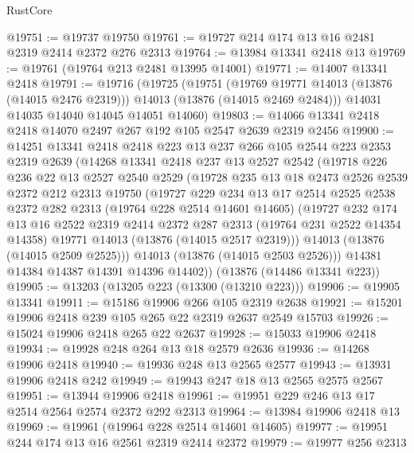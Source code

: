 \begin{lexlean}{RustCore}
\begin{coremodule}
@19751 := @19737 @19750
@19761 := @19727 @214 @174 @13 @16 @2481 @2319 @2414 @2372 @276 @2313
@19764 := @13984 @13341 @2418 @13
@19769 := @19761 (@19764 @213 @2481 @13995 @14001)
@19771 := @14007 @13341 @2418
@19791 := @19716
    (@19725
      (@19751
        (@19769 @19771 @14013 (@13876 (@14015 @2476 @2319)))
        @14013
        (@13876 (@14015 @2469 @2484)))
      @14031
      @14035
      @14040
      @14045
      @14051
      @14060)
@19803 := @14066 @13341 @2418 @2418 @14070 @2497 @267 @192 @105 @2547 @2639 @2319 @2456
@19900 := @14251
    @13341
    @2418
    @2418
    @223
    @13
    @237
    @266
    @105
    @2544
    @223
    @2353
    @2319
    @2639
    (@14268
      @13341
      @2418
      @237
      @13
      @2527
      @2542
      (@19718
        @226
        @236
        @22
        @13
        @2527
        @2540
        @2529
        (@19728
          @235
          @13
          @18
          @2473
          @2526
          @2539
          @2372
          @212
          @2313
          @19750
          (@19727
            @229
            @234
            @13
            @17
            @2514
            @2525
            @2538
            @2372
            @282
            @2313
            (@19764 @228 @2514 @14601 @14605)
            (@19727
              @232
              @174
              @13
              @16
              @2522
              @2319
              @2414
              @2372
              @287
              @2313
              (@19764 @231 @2522 @14354 @14358)
              @19771
              @14013
              (@13876 (@14015 @2517 @2319)))
            @14013
            (@13876 (@14015 @2509 @2525)))
          @14013
          (@13876 (@14015 @2503 @2526)))
        @14381
        @14384
        @14387
        @14391
        @14396
        @14402))
    (@13876 (@14486 @13341 @223))
@19905 := @13203 (@13205 @223 (@13300 (@13210 @223)))
@19906 := @19905 @13341
@19911 := @15186 @19906 @266 @105 @2319 @2638
@19921 := @15201 @19906 @2418 @239 @105 @265 @22 @2319 @2637 @2549 @15703
@19926 := @15024 @19906 @2418 @265 @22 @2637
@19928 := @15033 @19906 @2418
@19934 := @19928 @248 @264 @13 @18 @2579 @2636
@19936 := @14268 @19906 @2418
@19940 := @19936 @248 @13 @2565 @2577
@19943 := @13931 @19906 @2418 @242
@19949 := @19943 @247 @18 @13 @2565 @2575 @2567
@19951 := @13944 @19906 @2418
@19961 := @19951 @229 @246 @13 @17 @2514 @2564 @2574 @2372 @292 @2313
@19964 := @13984 @19906 @2418 @13
@19969 := @19961 (@19964 @228 @2514 @14601 @14605)
@19977 := @19951 @244 @174 @13 @16 @2561 @2319 @2414 @2372
@19979 := @19977 @256 @2313

\end{coremodule}
\end{lexlean}
